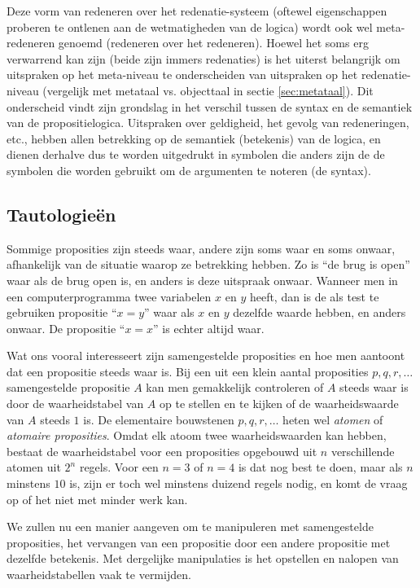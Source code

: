 Deze vorm van redeneren over het redenatie-systeem (oftewel eigenschappen proberen te ontlenen aan de wetmatigheden van de logica) wordt ook wel meta-redeneren genoemd (redeneren over het redeneren). Hoewel het soms erg verwarrend kan zijn (beide zijn immers redenaties) is het uiterst belangrijk om uitspraken op het meta-niveau te onderscheiden van uitspraken op het redenatie-niveau (vergelijk met metataal vs. objecttaal in sectie \ref{sec:metataal}). Dit onderscheid vindt zijn grondslag in het verschil tussen de syntax en de semantiek van de propositielogica. Uitspraken over geldigheid, het gevolg van redeneringen, etc., hebben allen betrekking op de semantiek (betekenis) van de logica, en dienen derhalve dus te worden uitgedrukt in symbolen die anders zijn de de symbolen die worden gebruikt om de argumenten te noteren (de syntax). 

\subsection{Tautologie\"en}
Sommige proposities zijn steeds waar, andere zijn soms waar en soms onwaar, afhankelijk van de situatie waarop ze betrekking hebben. Zo is \enquote{de brug is open} waar als de brug open is, en anders is deze uitspraak onwaar. Wanneer men in een computerprogramma twee variabelen $x$ en $y$ heeft, dan is de als test te gebruiken propositie \enquote{$x=y$} waar als $x$ en $y$ dezelfde waarde hebben, en anders onwaar. De propositie \enquote{$x=x$} is echter altijd waar.

Wat ons vooral interesseert zijn samengestelde proposities en hoe men aantoont dat een propositie steeds waar is. Bij een uit een klein aantal proposities $p, q, r,\ldots$ samengestelde propositie $A$ kan men gemakkelijk controleren of $A$ steeds waar is door de waarheidstabel van $A$ op te stellen en te kijken of de waarheidswaarde van $A$ steeds $1$ is. De elementaire bouwstenen $p, q, r,\ldots$ heten wel \textit{atomen} of \textit{atomaire proposities}. Omdat elk atoom twee waarheidswaarden kan hebben, bestaat de waarheidstabel voor een proposities opgebouwd uit $n$ verschillende atomen uit $2^n$ regels. Voor een $n=3$ of $n=4$ is dat nog best te doen, maar als $n$ minstens $10$ is, zijn er toch wel minstens duizend regels nodig, en komt de vraag op of het niet met minder werk kan.

We zullen nu een manier aangeven om te manipuleren met samengestelde proposities, het vervangen van een propositie door een andere propositie met dezelfde betekenis. Met dergelijke manipulaties is het opstellen en nalopen van waarheidstabellen vaak te vermijden.

